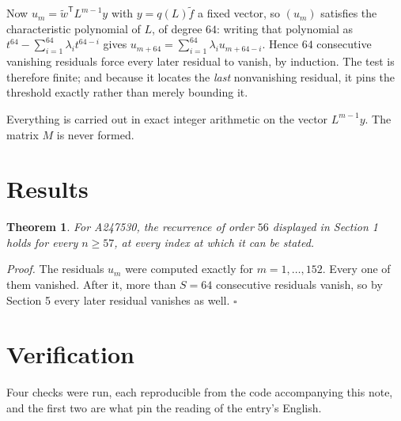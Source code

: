 \documentclass[11pt]{article}
\newtheorem{theorem}{Theorem}
\theoremstyle{definition}
\begin{document}
Now $u_m = \tilde w^{\mathsf T} L^{m-1} y$ with $y = q(L)\tilde f$ a fixed vector, so $(u_m)$ satisfies the characteristic polynomial of $L$, of degree $64$: writing that polynomial as $t^{64} - \sum_{i=1}^{64} \lambda_i t^{64-i}$ gives $u_{m+64} = \sum_{i=1}^{64} \lambda_i u_{m+64-i}$. Hence $64$ consecutive vanishing residuals force every later residual to vanish, by induction. The test is therefore finite; and because it locates the {\itshape last} nonvanishing residual, it pins the threshold exactly rather than merely bounding it.

Everything is carried out in exact integer arithmetic on the vector $L^{m-1}y$. The matrix $M$ is never formed.

\section{Results}

\begin{theorem} For A247530, the recurrence of order $56$ displayed in Section 1 holds for every $n \ge 57$, at every index at which it can be stated.\end{theorem}

{\itshape Proof.} The residuals $u_m$ were computed exactly for $m = 1,\dots,152$. Every one of them vanished. After it, more than $S = 64$ consecutive residuals vanish, so by Section 5 every later residual vanishes as well. $\square$

\section{Verification}

Four checks were run, each reproducible from the code accompanying this note, and the first two are what pin the reading of the entry's English.
\end{document}

